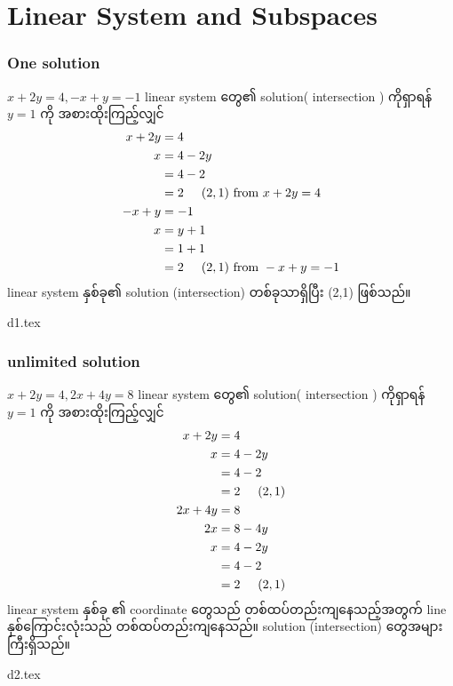 \chapter{Linear System and Subspaces}
\subsection*{One solution}
$x+2y=4, -x+y=-1$ linear system တွေ၏ solution( intersection ) ကိုရှာရန် $y=1$ ကို အစားထိုးကြည့်လျှင်
\[
    \begin{split}
        x+2y&=4 \\
        x&=4-2y \\
        &=4-2 \\
        &=2\hspace{5mm}(2,1)\text{ from }x+2y=4 \\
        -x+y&=-1 \\
        x&=y+1 \\
        &=1+1 \\
        &=2\hspace{5mm}(2,1)\text{ from }-x+y=-1 \\
    \end{split}
\]
linear system နှစ်ခု၏ solution (intersection) တစ်ခုသာရှိပြီး (2,1) ဖြစ်သည်။
\begin{center}
    {d1.tex}
\end{center}
\subsection*{unlimited solution}
$x+2y=4, 2x+4y=8$ linear system တွေ၏ solution( intersection ) ကိုရှာရန် $y=1$ ကို အစားထိုးကြည့်လျှင်
\[
    \begin{split}
        x+2y&=4 \\
        x&=4-2y \\
        &=4-2 \\
        &=2\hspace{5mm}(2,1) \\
        2x+4y&=8 \\
        2x&=8-4y \\
        x&=4-2y \\
        &=4-2 \\
        &=2\hspace{5mm}(2,1) \\
    \end{split}
\]
linear system နှစ်ခု ၏ coordinate တွေသည် တစ်ထပ်တည်းကျနေသည့်အတွက် line နှစ်ကြောင်းလုံးသည် တစ်ထပ်တည်းကျနေသည်။ solution (intersection) တွေအများကြီးရှိသည်။
\begin{center}
    {d2.tex}
\end{center}
